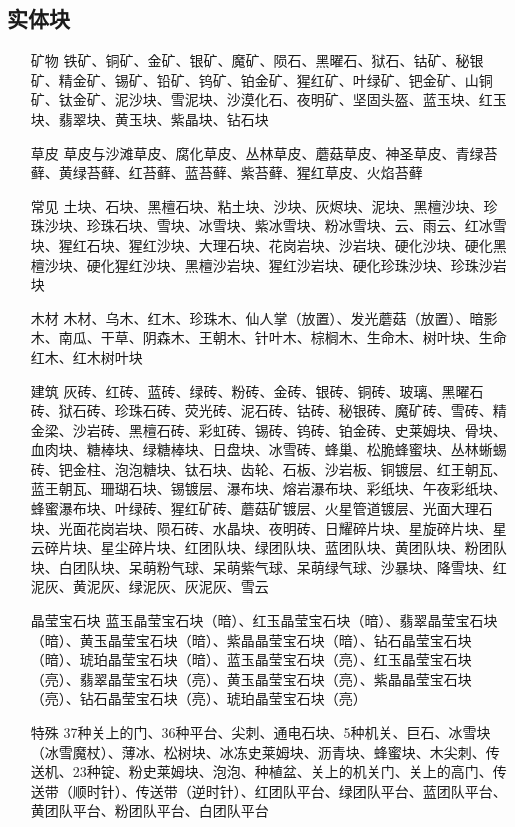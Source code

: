 \subsection{实体块}
\begin{itemize}
\item[矿物] 铁矿、铜矿、金矿、银矿、魔矿、陨石、黑曜石、狱石、钴矿、秘银矿、精金矿、锡矿、铅矿、钨矿、铂金矿、猩红矿、叶绿矿、钯金矿、山铜矿、钛金矿、泥沙块、雪泥块、沙漠化石、夜明矿、坚固头盔、蓝玉块、红玉块、翡翠块、黄玉块、紫晶块、钻石块
\item[草皮] 草皮与沙滩草皮、腐化草皮、丛林草皮、蘑菇草皮、神圣草皮、青绿苔藓、黄绿苔藓、红苔藓、蓝苔藓、紫苔藓、猩红草皮、火焰苔藓
\item[常见] 土块、石块、黑檀石块、粘土块、沙块、灰烬块、泥块、黑檀沙块、珍珠沙块、珍珠石块、雪块、冰雪块、紫冰雪块、粉冰雪块、云、雨云、红冰雪块、猩红石块、猩红沙块、大理石块、花岗岩块、沙岩块、硬化沙块、硬化黑檀沙块、硬化猩红沙块、黑檀沙岩块、猩红沙岩块、硬化珍珠沙块、珍珠沙岩块
\item[木材] 木材、乌木、红木、珍珠木、仙人掌（放置）、发光蘑菇（放置）、暗影木、南瓜、干草、阴森木、王朝木、针叶木、棕榈木、生命木、树叶块、生命红木、红木树叶块
\item[建筑] 灰砖、红砖、蓝砖、绿砖、粉砖、金砖、银砖、铜砖、玻璃、黑曜石砖、狱石砖、珍珠石砖、荧光砖、泥石砖、钴砖、秘银砖、魔矿砖、雪砖、精金梁、沙岩砖、黑檀石砖、彩虹砖、锡砖、钨砖、铂金砖、史莱姆块、骨块、血肉块、糖棒块、绿糖棒块、日盘块、冰雪砖、蜂巢、松脆蜂蜜块、丛林蜥蜴砖、钯金柱、泡泡糖块、钛石块、齿轮、石板、沙岩板、铜镀层、红王朝瓦、蓝王朝瓦、珊瑚石块、锡镀层、瀑布块、熔岩瀑布块、彩纸块、午夜彩纸块、蜂蜜瀑布块、叶绿砖、猩红矿砖、蘑菇矿镀层、火星管道镀层、光面大理石块、光面花岗岩块、陨石砖、水晶块、夜明砖、日耀碎片块、星旋碎片块、星云碎片块、星尘碎片块、红团队块、绿团队块、蓝团队块、黄团队块、粉团队块、白团队块、呆萌粉气球、呆萌紫气球、呆萌绿气球、沙暴块、降雪块、红泥灰、黄泥灰、绿泥灰、灰泥灰、雪云
\item[晶莹宝石块] 蓝玉晶莹宝石块（暗）、红玉晶莹宝石块（暗）、翡翠晶莹宝石块（暗）、黄玉晶莹宝石块（暗）、紫晶晶莹宝石块（暗）、钻石晶莹宝石块（暗）、琥珀晶莹宝石块（暗）、蓝玉晶莹宝石块（亮）、红玉晶莹宝石块（亮）、翡翠晶莹宝石块（亮）、黄玉晶莹宝石块（亮）、紫晶晶莹宝石块（亮）、钻石晶莹宝石块（亮）、琥珀晶莹宝石块（亮）
\item[特殊] 37种关上的门、36种平台、尖刺、通电石块、5种机关、巨石、冰雪块（冰雪魔杖）、薄冰、松树块、冰冻史莱姆块、沥青块、蜂蜜块、木尖刺、传送机、23种锭、粉史莱姆块、泡泡、种植盆、关上的机关门、关上的高门、传送带（顺时针）、传送带（逆时针）、红团队平台、绿团队平台、蓝团队平台、黄团队平台、粉团队平台、白团队平台
\end{itemize}

